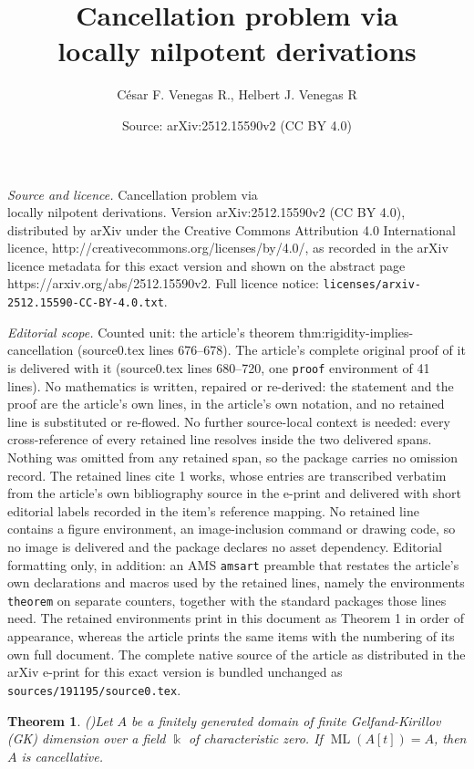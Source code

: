 \documentclass[10pt,a4paper]{amsart}
\title{Cancellation problem via \\ locally nilpotent derivations}
\author{C\'esar F. Venegas R., Helbert J. Venegas R}
\date{Source: arXiv:2512.15590v2 (CC BY 4.0)}
\newtheorem{theorem}{Theorem}
\DeclareMathOperator{\ML}{ML}
\begin{document}
\maketitle

\noindent\emph{Source and licence.} Cancellation problem via \\ locally nilpotent derivations. Version arXiv:2512.15590v2 (CC BY 4.0), distributed by arXiv under the Creative Commons Attribution 4.0 International licence, http://creativecommons.org/licenses/by/4.0/, as recorded in the arXiv licence metadata for this exact version and shown on the abstract page https://arxiv.org/abs/2512.15590v2. Full licence notice: \texttt{licenses/arxiv-2512.15590-CC-BY-4.0.txt}.\par\smallskip

\noindent\textit{Editorial scope.} Counted unit: the article's theorem thm:rigidity-implies-cancellation (source0.tex lines 676--678). The article's complete original proof of it is delivered with it (source0.tex lines 680--720, one \texttt{proof} environment of 41 lines). No mathematics is written, repaired or re-derived: the statement and the proof are the article's own lines, in the article's own notation, and no retained line is substituted or re-flowed.  No further source-local context is needed: every cross-reference of every retained line resolves inside the two delivered spans.  Nothing was omitted from any retained span, so the package carries no omission record.  The retained lines cite 1 works, whose entries are transcribed verbatim from the article's own bibliography source in the e-print and delivered with short editorial labels recorded in the item's reference mapping.  No retained line contains a figure environment, an image-inclusion command or drawing code, so no image is delivered and the package declares no asset dependency.  Editorial formatting only, in addition: an AMS \texttt{amsart} preamble that restates the article's own declarations and macros used by the retained lines, namely the environments \texttt{theorem} on separate counters, together with the standard packages those lines need.  The retained environments print in this document as Theorem 1 in order of appearance, whereas the article prints the same items with the numbering of its own full document.  The complete native source of the article as distributed in the arXiv e-print for this exact version is bundled unchanged as \texttt{sources/191195/source0.tex}.
\begin{theorem}(\cite[Theorem 3.3]{BellZhang2017})\label{thm:rigidity-implies-cancellation}
Let $A$ be a finitely generated domain of finite Gelfand-Kirillov (GK) dimension over a field $\Bbbk$ of characteristic zero. If $\ML(A[t]) = A$, then $A$ is cancellative.
\end{theorem}
\end{document}
